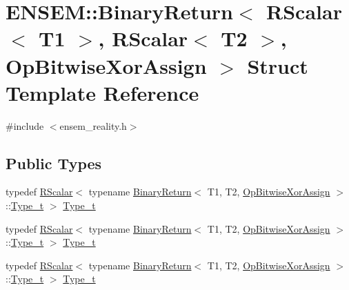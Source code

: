 \hypertarget{structENSEM_1_1BinaryReturn_3_01RScalar_3_01T1_01_4_00_01RScalar_3_01T2_01_4_00_01OpBitwiseXorAssign_01_4}{}\section{E\+N\+S\+EM\+:\+:Binary\+Return$<$ R\+Scalar$<$ T1 $>$, R\+Scalar$<$ T2 $>$, Op\+Bitwise\+Xor\+Assign $>$ Struct Template Reference}
\label{structENSEM_1_1BinaryReturn_3_01RScalar_3_01T1_01_4_00_01RScalar_3_01T2_01_4_00_01OpBitwiseXorAssign_01_4}


{\ttfamily \#include $<$ensem\+\_\+reality.\+h$>$}

\subsection*{Public Types}
\begin{DoxyCompactItemize}
\item 
typedef \mbox{\hyperlink{classENSEM_1_1RScalar}{R\+Scalar}}$<$ typename \mbox{\hyperlink{structENSEM_1_1BinaryReturn}{Binary\+Return}}$<$ T1, T2, \mbox{\hyperlink{structENSEM_1_1OpBitwiseXorAssign}{Op\+Bitwise\+Xor\+Assign}} $>$\+::\mbox{\hyperlink{structENSEM_1_1BinaryReturn_3_01RScalar_3_01T1_01_4_00_01RScalar_3_01T2_01_4_00_01OpBitwiseXorAssign_01_4_aa6f274b3036467e06b0e918d36ce0151}{Type\+\_\+t}} $>$ \mbox{\hyperlink{structENSEM_1_1BinaryReturn_3_01RScalar_3_01T1_01_4_00_01RScalar_3_01T2_01_4_00_01OpBitwiseXorAssign_01_4_aa6f274b3036467e06b0e918d36ce0151}{Type\+\_\+t}}
\item 
typedef \mbox{\hyperlink{classENSEM_1_1RScalar}{R\+Scalar}}$<$ typename \mbox{\hyperlink{structENSEM_1_1BinaryReturn}{Binary\+Return}}$<$ T1, T2, \mbox{\hyperlink{structENSEM_1_1OpBitwiseXorAssign}{Op\+Bitwise\+Xor\+Assign}} $>$\+::\mbox{\hyperlink{structENSEM_1_1BinaryReturn_3_01RScalar_3_01T1_01_4_00_01RScalar_3_01T2_01_4_00_01OpBitwiseXorAssign_01_4_aa6f274b3036467e06b0e918d36ce0151}{Type\+\_\+t}} $>$ \mbox{\hyperlink{structENSEM_1_1BinaryReturn_3_01RScalar_3_01T1_01_4_00_01RScalar_3_01T2_01_4_00_01OpBitwiseXorAssign_01_4_aa6f274b3036467e06b0e918d36ce0151}{Type\+\_\+t}}
\item 
typedef \mbox{\hyperlink{classENSEM_1_1RScalar}{R\+Scalar}}$<$ typename \mbox{\hyperlink{structENSEM_1_1BinaryReturn}{Binary\+Return}}$<$ T1, T2, \mbox{\hyperlink{structENSEM_1_1OpBitwiseXorAssign}{Op\+Bitwise\+Xor\+Assign}} $>$\+::\mbox{\hyperlink{structENSEM_1_1BinaryReturn_3_01RScalar_3_01T1_01_4_00_01RScalar_3_01T2_01_4_00_01OpBitwiseXorAssign_01_4_aa6f274b3036467e06b0e918d36ce0151}{Type\+\_\+t}} $>$ \mbox{\hyperlink{structENSEM_1_1BinaryReturn_3_01RScalar_3_01T1_01_4_00_01RScalar_3_01T2_01_4_00_01OpBitwiseXorAssign_01_4_aa6f274b3036467e06b0e918d36ce0151}{Type\+\_\+t}}
\end{DoxyCompactItemize}


